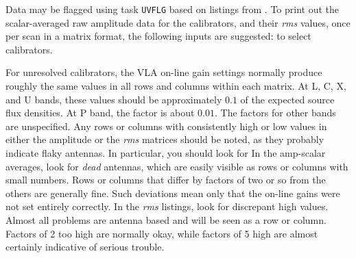 
      Data may be flagged using task {\tt UVFLG} based on
listings from \hbox{{\tt {}}}.  To print out the
scalar-averaged raw amplitude data for the calibrators, and their {\it
rms\/} values, once per scan in a matrix format, the following inputs
are suggested:
 {to select calibrators.}

      For unresolved calibrators, the VLA on-line gain settings
normally produce roughly the same values in all rows and columns
within each matrix.  At L, C, X, and U bands, these values should be
approximately $0.1$ of the expected source flux densities.  At P band,
the factor is about $0.01$.  The factors for other bands are
unspecified.  Any rows or columns with consistently high or low values
in either the amplitude or the {\it rms\/}  matrices should be noted,
as they probably indicate flaky antennas.  In particular, you should
look for
\xbit
\Item In the amp-scalar averages, look for {\it dead\/} antennas,
     which are easily visible as rows or columns with small numbers.
     Rows or columns that differ by factors of two or so from the
     others are generally fine.  Such deviations mean only that the
     on-line gains were not set entirely correctly.
\Item In the {\it rms\/} listings, look for discrepant high values.
     Almost all problems are antenna based and will be seen as a row
     or column.  Factors of 2 too high are normally okay, while
     factors of 5 high are almost certainly indicative of serious
     trouble.
\xeit
{}


